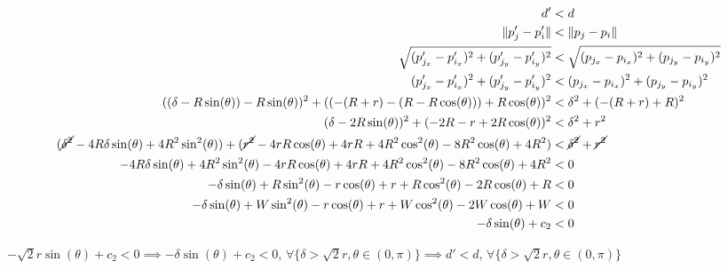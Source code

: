 \documentclass[conference]{IEEEtran}
\begin{document}
    {%
      \setlength{\belowdisplayskip}{3pt}%
      \setlength{\abovedisplayskip}{3pt}%
      \begin{align*}
        d' &< d \\
        \lVert p'_j - p'_i \rVert &< \lVert p_j - p_i \rVert \\
        \sqrt{(p'_{j_x} - p'_{i_x})^2 + (p'_{j_y} - p'_{i_y})^2} &< \sqrt{(p_{j_x} - p_{i_x})^2 + (p_{j_y} - p_{i_y})^2} \\
        (p'_{j_x} - p'_{i_x})^2 + (p'_{j_y} - p'_{i_y})^2 &< (p_{j_x} - p_{i_x})^2 + (p_{j_y} - p_{i_y})^2 \\
        ((\delta - R\sin(\theta)) - R\sin(\theta))^2 + ((-(R+r)-(R-R\cos(\theta))) + R\cos(\theta))^2 &< \delta^2 + (-(R+r) + R)^2 \\
        (\delta - 2R\sin(\theta))^2 + (-2R-r+2R\cos(\theta))^2 &< \delta^2 + r^2 \\
        (\cancel{\delta^2} - 4R\delta\sin(\theta) + 4R^2\sin^2(\theta)) + (\cancel{r^2}-4rR\cos(\theta)+4rR+4R^2\cos^2(\theta)- 8R^2\cos(\theta) + 4R^2) &< \cancel{\delta^2} + \cancel{r^2} \\
        -4R\delta\sin(\theta) + 4R^2\sin^2(\theta) - 4rR\cos(\theta)+4rR+4R^2\cos^2(\theta)- 8R^2\cos(\theta) + 4R^2 &< 0 \\
        -\delta\sin(\theta) + R\sin^2(\theta) - r\cos(\theta) + r + R\cos^2(\theta)- 2R\cos(\theta) + R &< 0 \\
        -\delta\sin(\theta) + W\sin^2(\theta) - r\cos(\theta) + r + W\cos^2(\theta)- 2W\cos(\theta) + W &< 0 \\
        -\delta\sin(\theta) + c_2 &< 0
      \end{align*}
    }

    $-\sqrt{2}r\sin(\theta) + c_2<0 \implies -\delta\sin(\theta) + c_2<0$, $\forall \{\delta > \sqrt{2}r, \theta\in(0,\pi)\} \implies d'<d$, $\forall \{\delta > \sqrt{2}r, \theta\in(0,\pi)\}$


\end{document}
